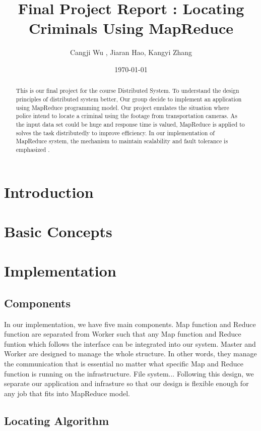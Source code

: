 \documentclass[12pt]{article}
\begin{document}
\title{Final Project Report : Locating Criminals Using MapReduce}
\author{Cangji Wu , Jiaran Hao, Kangyi Zhang}
\date{\today}
\maketitle

\begin{abstract}
This is our final project for the course Distributed System. To understand the design principles
of distributed system better, Our group decide to implement an application using MapReduce programming model. 
Our project emulates the situation where police intend to locate a criminal using the footage from transportation cameras. 
As the input data set could be huge and response time is valued, MapReduce is applied to solves the task distributedly to
improve efficiency. In our implementation of MapReduce system, the mechanism to maintain scalability and fault tolerance is emphasized
. 
\end{abstract} 

\section {Introduction}


\section {Basic Concepts}


\section {Implementation}
\subsection{Components}

In our implementation, we have five main components. 
Map function and Reduce function are separated from Worker such that any Map function and Reduce funtion which
follows the interface can be integrated into our system.
Master and Worker are designed to manage the whole structure. In other words, they manage the communication that
is essential no matter what specific Map and Reduce function is running on the infrastructure.
File system...
Following this design, we separate our application and infrasture so that our design is flexible enough
for any job that fits into MapReduce model. 
\subsection{Locating Algorithm }
\end{document}
